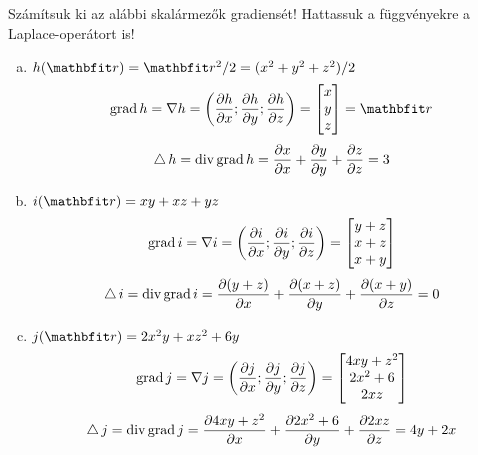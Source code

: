\documentclass[exercise]{math-standalone}
\begin{document}
\begin{exercise}{
    Számítsuk ki az alábbi skalármezők gradiensét! Hattassuk a függvényekre
    a Laplace-operátort is!
  }
{\begin{enumerate}[a)]
      \item $h(\rvec r) = \rvec r^2 / 2 = (x^2 + y^2 + z^2) / 2$
            \[
              \grad h
              =
              \nabla h
              =
              \left(
              \pdv{h}{x}; \pdv{h}{y}; \pdv{h}{z}
              \right)
              =
              \begin{bmatrix}
                x \\ y \\ z
              \end{bmatrix}
              =
              \rvec r
            \]
            \[
              \operatorname{\triangle} h
              =
              \operatorname{div} \operatorname{grad} h
              =
              \pdv{x}{x} + \pdv{y}{y} + \pdv{z}{z}
              =
              3
            \]

      \item $i(\rvec r) = xy + xz + yz$
            \[
              \operatorname{grad} i
              =
              \nabla i
              =
              \left(
              \pdv{i}{x}; \pdv{i}{y}; \pdv{i}{z}
              \right)
              =
              \begin{bmatrix}
                y + z \\ x + z \\ x + y
              \end{bmatrix}
            \]
            \[
              \operatorname{\triangle} i
              =
              \operatorname{div} \operatorname{grad} i
              =
              \pdv{(y + z)}{x} + \pdv{(x + z)}{y} + \pdv{(x + y)}{z}
              =
              0
            \]

      \item $j(\rvec r) = 2 x^2 y + x z^2 + 6 y$
            \[
              \operatorname{grad} j
              =
              \nabla j
              =
              \left(
              \pdv{j}{x}; \pdv{j}{y}; \pdv{j}{z}
              \right)
              =
              \begin{bmatrix}
                4 x y + z^2 \\
                2 x^2 + 6   \\
                2 x z
              \end{bmatrix}
            \]
            \[
              \operatorname{\triangle} j
              =
              \operatorname{div} \operatorname{grad} j
              =
              \pdv{4 x y + z^2}{x} + \pdv{2 x^2 + 6}{y} + \pdv{2 x z}{z}
              =
              4 y + 2 x
            \]
    \end{enumerate}
  }
\end{exercise}
\end{document}
